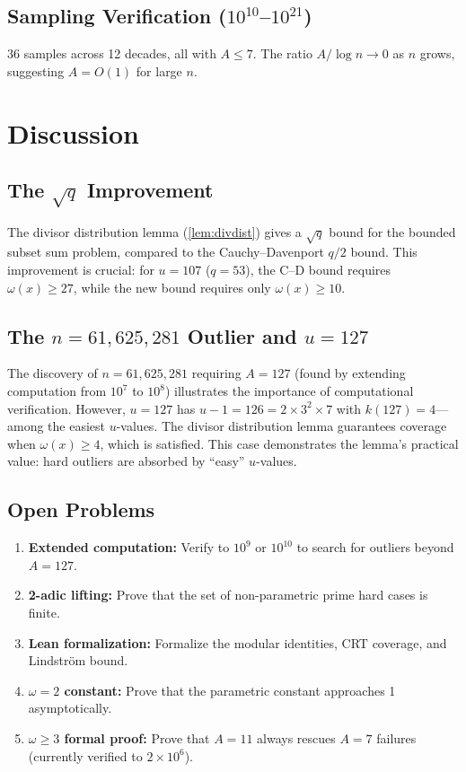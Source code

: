 \documentclass[11pt,a4paper]{article}
\theoremstyle{plain}
\theoremstyle{definition}
\begin{document}
\subsection{Sampling Verification ($10^{10}$--$10^{21}$)}

36 samples across 12 decades, all with $A \leq 7$. The ratio $A/\log n \to 0$ as $n$ grows, suggesting $A = O(1)$ for large $n$.

\section{Discussion}

\subsection{The $\sqrt{q}$ Improvement}

The divisor distribution lemma (\cref{lem:divdist}) gives a $\sqrt{q}$ bound for the bounded subset sum problem, compared to the Cauchy--Davenport $q/2$ bound. This improvement is crucial: for $u = 107$ ($q = 53$), the C--D bound requires $\omega(x) \geq 27$, while the new bound requires only $\omega(x) \geq 10$.

\subsection{The $n = 61{,}625{,}281$ Outlier and $u = 127$}

The discovery of $n = 61{,}625{,}281$ requiring $A = 127$ (found by extending computation from $10^7$ to $10^8$) illustrates the importance of computational verification. However, $u = 127$ has $u - 1 = 126 = 2 \times 3^2 \times 7$ with $k(127) = 4$---among the easiest $u$-values. The divisor distribution lemma guarantees coverage when $\omega(x) \geq 4$, which is satisfied. This case demonstrates the lemma's practical value: hard outliers are absorbed by ``easy'' $u$-values.

\subsection{Open Problems}

\begin{enumerate}
\item \textbf{Extended computation:} Verify to $10^9$ or $10^{10}$ to search for outliers beyond $A = 127$.
\item \textbf{2-adic lifting:} Prove that the set of non-parametric prime hard cases is finite.
\item \textbf{Lean formalization:} Formalize the modular identities, CRT coverage, and Lindstr\"om bound.
\item \textbf{$\omega = 2$ constant:} Prove that the parametric constant approaches 1 asymptotically.
\item \textbf{$\omega \geq 3$ formal proof:} Prove that $A = 11$ always rescues $A = 7$ failures (currently verified to $2 \times 10^6$).
\end{enumerate}
\end{document}
